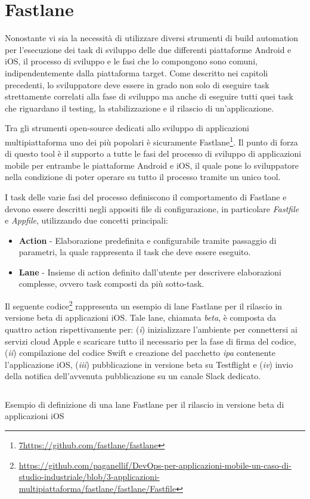 \section{Fastlane}
\label{fastlane-sec}
Nonostante vi sia la necessità di utilizzare diversi strumenti di build automation per l'esecuzione dei task di sviluppo delle due differenti piattaforme Android e iOS,
il processo di sviluppo e le fasi che lo compongono sono comuni,
indipendentemente dalla piattaforma target. 
Come descritto nei capitoli precedenti, 
lo sviluppatore deve essere in grado non solo di eseguire task strettamente correlati alla fase di sviluppo ma anche di eseguire tutti quei task che riguardano il testing, 
la stabilizzazione e il rilascio di un'applicazione.

Tra gli strumenti open-source dedicati allo sviluppo di applicazioni multipiattaforma uno dei più popolari è sicuramente Fastlane\footnote{\href{7https://github.com/fastlane/fastlane}{7https://github.com/fastlane/fastlane}}. 
Il punto di forza di questo tool è il supporto a tutte le fasi del processo di sviluppo di applicazioni mobile per entrambe le piattaforme Android e iOS,
il quale pone lo sviluppatore nella condizione di poter operare su tutto il processo tramite un unico tool.

I task delle varie fasi del processo definiscono il comportamento di Fastlane e devono essere descritti negli appositi file di configurazione,
in particolare \textit{Fastfile} e \textit{Appfile},
utilizzando due concetti principali:

\begin{itemize}
    \item \textbf{Action} - Elaborazione predefinita e configurabile tramite passaggio di parametri, la quale rappresenta il task che deve essere eseguito.
    
    \item \textbf{Lane} - Insieme di action definito dall'utente per descrivere elaborazioni complesse, ovvero task composti da più sotto-task.
\end{itemize}

Il seguente codice\footnote{\href{https://github.com/paganellif/DevOps-per-applicazioni-mobile-un-caso-di-studio-industriale/blob/3-applicazioni-multipiattaforma/fastlane/fastlane/Fastfile}{https://github.com/paganellif/DevOps-per-applicazioni-mobile-un-caso-di-studio-industriale/blob/3-applicazioni-multipiattaforma/fastlane/fastlane/Fastfile}} rappresenta un esempio di lane Fastlane per il rilascio in versione beta di applicazioni iOS. 
Tale lane, 
chiamata \textit{beta}, 
è composta da quattro action rispettivamente per: 
(\textit{i}) inizializzare l'ambiente per connettersi ai servizi cloud Apple e scaricare tutto il necessario per la fase di firma del codice, 
(\textit{ii}) compilazione del codice Swift e creazione del pacchetto \textit{ipa} contenente l'applicazione iOS, 
(\textit{iii}) pubblicazione in versione beta su Testflight e 
(\textit{iv}) invio della notifica dell'avvenuta pubblicazione su un canale Slack dedicato.

\begin{listing}[H]
    \inputminted{ruby}{code/4-fastlane}
    \caption{Esempio di definizione di una lane Fastlane per il rilascio in versione beta di applicazioni iOS}
\end{listing}
